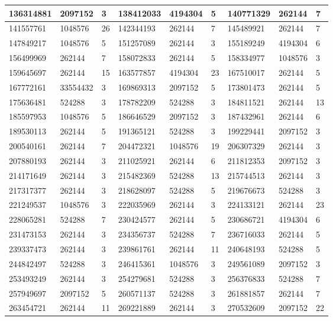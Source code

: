 \documentclass{article}
\begin{document}
\begin{longtable}{|l|l|l||l|l|l||l|l|l|}
\hline
136314881 & 2097152 & 3 & 138412033 & 4194304 & 5 & 140771329 & 262144 & 7 \\
\hline
141557761 & 1048576 & 26 & 142344193 & 262144 & 7 & 145489921 & 262144 & 7 \\
\hline
147849217 & 1048576 & 5 & 151257089 & 262144 & 3 & 155189249 & 4194304 & 6 \\
\hline
156499969 & 262144 & 7 & 158072833 & 262144 & 5 & 158334977 & 1048576 & 3 \\
\hline
159645697 & 262144 & 15 & 163577857 & 4194304 & 23 & 167510017 & 262144 & 5 \\
\hline
167772161 & 33554432 & 3 & 169869313 & 2097152 & 5 & 173801473 & 262144 & 5 \\
\hline
175636481 & 524288 & 3 & 178782209 & 524288 & 3 & 184811521 & 262144 & 13 \\
\hline
185597953 & 1048576 & 5 & 186646529 & 2097152 & 3 & 187432961 & 262144 & 6 \\
\hline
189530113 & 262144 & 5 & 191365121 & 524288 & 3 & 199229441 & 2097152 & 3 \\
\hline
200540161 & 262144 & 7 & 204472321 & 1048576 & 19 & 206307329 & 262144 & 3 \\
\hline
207880193 & 262144 & 3 & 211025921 & 262144 & 6 & 211812353 & 2097152 & 3 \\
\hline
214171649 & 262144 & 3 & 215482369 & 524288 & 13 & 215744513 & 262144 & 3 \\
\hline
217317377 & 262144 & 3 & 218628097 & 524288 & 5 & 219676673 & 524288 & 3 \\
\hline
221249537 & 1048576 & 3 & 222035969 & 262144 & 3 & 224133121 & 262144 & 23 \\
\hline
228065281 & 524288 & 7 & 230424577 & 262144 & 5 & 230686721 & 4194304 & 6 \\
\hline
231473153 & 262144 & 3 & 234356737 & 524288 & 7 & 236716033 & 262144 & 5 \\
\hline
239337473 & 262144 & 3 & 239861761 & 262144 & 11 & 240648193 & 524288 & 5 \\
\hline
244842497 & 524288 & 3 & 246415361 & 1048576 & 3 & 249561089 & 2097152 & 3 \\
\hline
253493249 & 262144 & 3 & 254279681 & 524288 & 3 & 256376833 & 524288 & 7 \\
\hline
257949697 & 2097152 & 5 & 260571137 & 524288 & 3 & 261881857 & 262144 & 7 \\
\hline
263454721 & 262144 & 11 & 269221889 & 262144 & 3 & 270532609 & 2097152 & 22 \\

\end{longtable}
\end{document}
